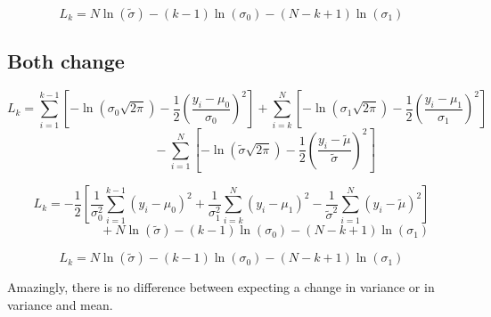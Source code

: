 \documentclass[11pt]{article}
\begin{document}
\[L_k=N\ln(\tilde\sigma)-(k-1)\ln(\sigma_0)-(N-k+1)\ln(\sigma_1)\]

\subsection{Both change}

\[L_k=
\sum_{i=1}^{k-1}\left[-\ln(\sigma_0\sqrt{2\pi})-\frac 12\left(\frac{y_i-\mu_0}{\sigma_0}\right)^2\right]
+\sum_{i=k}^N\left[-\ln(\sigma_1\sqrt{2\pi})-\frac 12\left(\frac{y_i-\mu_1}{\sigma_1}\right)^2\right]\]
\[~~~~~~~~~~~~~~~~~~~~~~~~-\sum_{i=1}^N\left[-\ln(\tilde\sigma\sqrt{2\pi})-\frac 12\left(\frac{y_i-\tilde\mu}{\tilde\sigma}\right)^2\right]\]

\[L_k=
-\frac 12\left[\frac 1{\sigma_0^2}\sum_{i=1}^{k-1}(y_i-\mu_0)^2
+\frac 1{\sigma_1^2}\sum_{i=k}^N(y_i-\mu_1)^2
-\frac 1{\tilde\sigma^2}\sum_{i=1}^N(y_i-\tilde\mu)^2\right]\]
\[~~~~~~~~~~~~~~~~~~~~~~~~+N\ln(\tilde\sigma)-(k-1)\ln(\sigma_0)-(N-k+1)\ln(\sigma_1)\]

\[L_k=N\ln(\tilde\sigma)-(k-1)\ln(\sigma_0)-(N-k+1)\ln(\sigma_1)\]

Amazingly, there is no difference between expecting a change in variance or in variance and mean.
\end{document}
